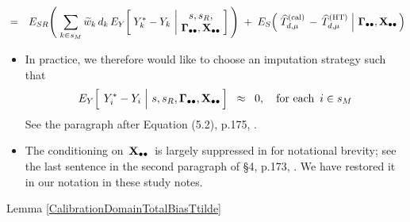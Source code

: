 \begin{lemma}
\begin{enumerate}
\begin{eqnarray*}
    \\
    & = &
        E_{SR}\!\left(\;
            \underset{k\in{\color{black}s_{M}}}{\sum}\,\widetilde{w}_{k}\,d_{k}\,
            E_{Y}\!\left[\;
                Y^{*}_{k} \overset{{\color{white}.}}{-} Y_{k}
                \,\left\vert\!
                \begin{array}{c} s,s_{R}, \\ \Gdotdot,\Xobs \end{array}
                \right.
                \!\!\right]
            \,\right)
        \; + \;
        E_{S}\!\left(\,
            \left.
            \widehat{T}^{\textnormal{(cal)}}_{d,\mu}
            \,\overset{{\color{white}.}}{-}\,
            \widehat{T}^{\textnormal{(HT)}}_{d,\mu}
            \;\right\vert\!\!
            \begin{array}{c} \Gdotdot,\Xobs \end{array}
            \!\!\right)
    \end{eqnarray*}
\end{enumerate}
\end{lemma}
\begin{remark}\label{CalibrationDomainTotalRemarkSmallUnitBias}
\mbox{}
\vskip -0.1cm
\noindent
\begin{itemize}
\item
    In practice, we therefore would like to choose an imputation strategy such that
    \begin{equation*}
    E_{Y}\!\left[\;
        \left.
        Y^{*}_{i} \overset{{\color{white}.}}{-} Y_{i}
        \;\right\vert\,
        s,s_{R},\Gdotdot,\Xobs
        \,\right]
    \;\; \approx \;\;
        0,
    \quad
    \textnormal{for each \,$i \in s_{M}$}
    \end{equation*}
    See the paragraph after Equation (5.2), p.175, \cite{Beaumont2011}.
\item
    The conditioning on \,$\mathbf{X}_{\bullet\bullet}$\, is largely suppressed in \cite{Beaumont2011} for notational brevity;
    see the last sentence in the second paragraph of \S4, p.173, \cite{Beaumont2011}.
    We have restored it in our notation in these study notes.
\end{itemize}
\end{remark}
\vskip 0.3cm
\noindent
\proofof Lemma \ref{CalibrationDomainTotalBiasTtilde}
\vskip 0.1cm
\renewcommand{\theenumi}{\roman{enumi}}
\renewcommand{\labelenumi}{\mbox{}\;\;\,(\theenumi)$\quad$}
